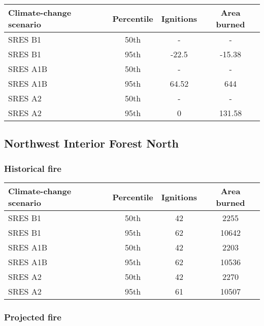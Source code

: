 \documentclass{article}\usepackage[]{graphicx}\usepackage[]{color}
\newcommand{\headcol}{\rowcolor{tableheadcolor}}
\begin{document}
\begin{table}[ht]
\centering
\begin{tabular}{lccc}
  \headcol 
 \toprule
Climate-change scenario & Percentile & Ignitions & Area burned \\ 
  \midrule
SRES B1 & 50th & - & - \\ 
  SRES B1 & 95th & -22.5 & -15.38 \\ 
  SRES A1B & 50th & - & - \\ 
  SRES A1B & 95th & 64.52 & 644 \\ 
  SRES A2 & 50th & - & - \\ 
  SRES A2 & 95th & 0 & 131.58 \\ 
   \bottomrule
\end{tabular}
\end{table}


\newpage
\subsection{Northwest Interior Forest North}
\subsubsection{Historical fire}

\begin{table}[ht]
\centering
\begin{tabular}{lccc}
  \headcol 
 \toprule
Climate-change scenario & Percentile & Ignitions & Area burned \\ 
  \midrule
SRES B1 & 50th & 42 & 2255 \\ 
  SRES B1 & 95th & 62 & 10642 \\ 
  SRES A1B & 50th & 42 & 2203 \\ 
  SRES A1B & 95th & 62 & 10536 \\ 
  SRES A2 & 50th & 42 & 2270 \\ 
  SRES A2 & 95th & 61 & 10507 \\ 
   \bottomrule
\end{tabular}
\end{table}


\subsubsection{Projected fire}
\end{document}
